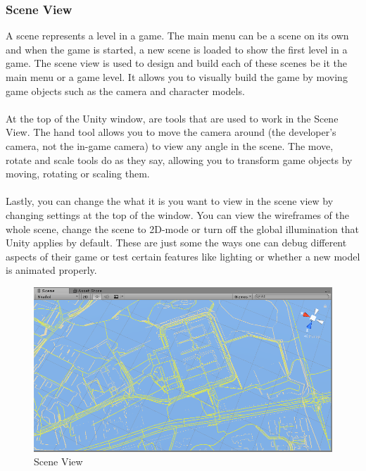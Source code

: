 \documentclass[a4paper]{report}
\begin{document}
\subsubsection{Scene View}
A scene represents a level in a game. The main menu can be a scene on its own and when the game is started, a new scene is loaded to show the first level in a game. The scene view is used to design and build each of these scenes be it the main menu or a game level. It allows you to visually build the game by moving game objects such as the camera and character models. 
\\\\
At the top of the Unity window, are tools that are used to work in the Scene View. The hand tool allows you to move the camera around (the developer's camera, not the in-game camera) to view any angle in the scene. The move, rotate and scale tools do as they say, allowing you to transform game objects by moving, rotating or scaling them.
\\\\
Lastly, you can change the what it is you want to view in the scene view by changing settings at the top of the window. You can view the wireframes of the whole scene, change the scene to 2D-mode or turn off the global illumination that Unity applies by default. These are just some the ways one can debug different aspects of their game or test certain features like lighting or whether a new model is animated properly. \cite{Unity}
\pagebreak
\begin{figure}[h]
	\centering
	\includegraphics[scale=0.7]{"scene view"}
	\caption{Scene View}
\end{figure}
\end{document}
